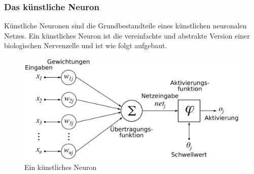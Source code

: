 \documentclass[12pt,oneside,a4paper,parskip]{scrbook}
\begin{document}
\subsubsection{Das künstliche Neuron}
Künstliche Neuronen sind die Grundbestandteile eines künstlichen neuronalen Netzes.
Ein künstliches Neuron ist die vereinfachte und abstrakte Version einer biologischen Nervenzelle und ist wie folgt aufgebaut.\\
\begin{figure}[h]
	\begin{center}
		\includegraphics[width=12cm]{Bilder/ArtificialNeuronModel_deutsch.png}
		\caption{Ein künstliches Neuron}
		\label{fig:wikiNeuron}
	\end{center}
\end{figure}
\end{document}
